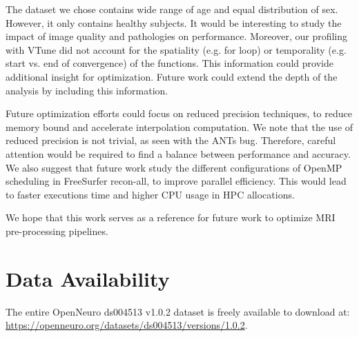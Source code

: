 \documentclass[conference]{IEEEtran}
\newcommand{\TG}[1]{\color{blue}\textsc{From Tristan: }#1\color{black}}
\newcommand{\MD}[1]{\color{magenta}\textsc{From Mathieu: }#1\color{black}}
\begin{document}
The dataset we chose contains wide range of age and equal distribution of sex. However, it only contains healthy subjects. It would be interesting to study the impact of image quality and pathologies on performance. Moreover, our profiling with VTune did not account for the spatiality (e.g. for loop) or temporality (e.g. start vs. end of convergence) of the functions. This information could provide additional insight for optimization. Future work could extend the depth of the analysis by including this information.

Future optimization efforts could focus on reduced precision techniques, to reduce memory bound and accelerate interpolation computation. We note that the use of reduced precision is not trivial, as seen with the ANTs bug. Therefore, careful attention would be required to find a balance between performance and accuracy. We also suggest that future work study the different configurations of OpenMP scheduling in FreeSurfer recon-all, to improve parallel efficiency. This would lead to faster executions time and higher CPU usage in HPC allocations.

We hope that this work serves as a reference for future work to optimize MRI pre-processing pipelines. 
			
\section{Data Availability}
\label{sec:data-availability}
The entire OpenNeuro ds004513 v1.0.2 dataset is freely available to download at:
\\\href{https://openneuro.org/datasets/ds004513/versions/1.0.2}{https://openneuro.org/datasets/ds004513/versions/1.0.2}.
	
\end{document}
